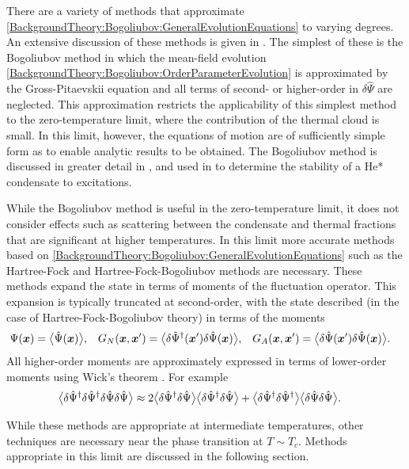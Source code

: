 There are a variety of methods that approximate \eqref{BackgroundTheory:Bogoliubov:GeneralEvolutionEquations} to varying degrees.  An extensive discussion of these methods is given in \citep{Proukakis:2008}.  The simplest of these is the Bogoliubov method in which the mean-field evolution \eqref{BackgroundTheory:Bogoliubov:OrderParameterEvolution} is approximated by the Gross-Pitaevskii equation and all terms of second- or higher-order in $\delta\hat{\Psi}$ are neglected.  This approximation restricts the applicability of this simplest method to the zero-temperature limit, where the contribution of the thermal cloud is small.  In this limit, however, the equations of motion are of sufficiently simple form as to enable analytic results to be obtained.  The Bogoliubov method is discussed in greater detail in , and used in  to determine the stability of a He* condensate to excitations.

While the Bogoliubov method is useful in the zero-temperature limit, it does not consider effects such as scattering between the condensate and thermal fractions that are significant at higher temperatures.  In this limit more accurate methods based on \eqref{BackgroundTheory:Bogoliubov:GeneralEvolutionEquations} such as the Hartree-Fock and Hartree-Fock-Bogoliubov methods are necessary.  These methods expand the state in terms of moments of the fluctuation operator.  This expansion is typically truncated at second-order, with the state described (in the case of Hartree-Fock-Bogoliubov theory) in terms of the moments
\begin{align*}
    \Psi(\bm{x}) &= {\big<\hat{\Psi}(\bm{x})\big>}, & G_N(\bm{x}, \bm{x}') &= {\big<\delta\hat{\Psi}^\dagger(\bm{x}') \delta\hat{\Psi}(\bm{x})\big>}, & G_A(\bm{x}, \bm{x}') &= {\big<\delta\hat{\Psi}(\bm{x}') \delta\hat{\Psi}(\bm{x})\big>}.
\end{align*}
All higher-order moments are approximately expressed in terms of lower-order moments using Wick's theorem \citep{Wick:1950,Blaizot:1986}.  For example
\begin{align}
    {\ensuremath{\big<\delta\hat{\Psi}^\dagger \delta\hat{\Psi}^\dagger \delta\hat{\Psi} \delta\hat{\Psi}\big>}} &\approx 2 {\big<\delta\hat{\Psi}^\dagger \delta\hat{\Psi}\big>} {\big<\delta\hat{\Psi}^\dagger \delta\hat{\Psi}\big>} + {\big<\delta\hat{\Psi}^\dagger \delta\hat{\Psi}^\dagger\big>} {\big<\delta\hat{\Psi} \delta\hat{\Psi}\big>}.
\end{align}

While these methods are appropriate at intermediate temperatures, other techniques are necessary near the phase transition at $T\sim T_c$.  Methods appropriate in this limit are discussed in the following section.

